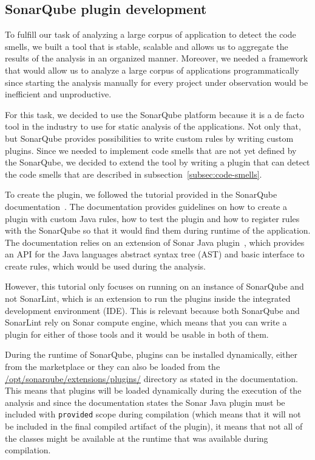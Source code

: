 \subsection{SonarQube plugin development}\label{subsec:sonarqube-plugin-development}

To fulfill our task of analyzing a large corpus of application to detect the code smells,
we built a tool that is stable, scalable and allows us to aggregate the results of the
analysis in an organized manner.
Moreover, we needed a framework that would allow us to analyze a large corpus of applications programmatically since starting
the analysis manually for every project under observation would be inefficient and unproductive.

For this task, we decided to use the SonarQube platform because it is a de facto tool in the industry to use
for static analysis of the applications.
Not only that, but SonarQube provides possibilities to write custom rules by writing custom plugins.
Since we needed to implement code smells that are not yet defined by the SonarQube, we decided to extend
the tool by writing a plugin that can detect the code smells that are described in subsection~\ref{subsec:code-smells}.

To create the plugin, we followed the tutorial provided in the SonarQube documentation~\cite{sonar_plugin_tutorial}.
The documentation provides guidelines on how to create a plugin with custom Java rules, how to test the plugin and
how to register rules with the SonarQube so that it would find them during runtime of the application.
The documentation relies on an extension of Sonar Java plugin~\cite{sonar_java_plugin}, which provides an API
for the Java languages abstract syntax tree (AST) and basic interface to create rules, which would be used
during the analysis.

However, this tutorial only focuses on running on an instance of SonarQube and not SonarLint, which is an
extension to run the plugins inside the integrated development environment (IDE).
This is relevant because both SonarQube and SonarLint rely on Sonar compute engine, which means that you can write
a plugin for either of those tools and it would be usable in both of them.

During the runtime of SonarQube, plugins can be installed dynamically, either from the marketplace or they can
also be loaded from the \url{/opt/sonarqube/extensions/plugins/} directory as stated in the documentation.
This means that plugins will be loaded dynamically during the execution of the analysis and since the documentation
states the Sonar Java plugin must be included with \verb|provided| scope during compilation (which means that it
will not be included in the final compiled artifact of the plugin), it means that not all of the classes might be
available at the runtime that was available during compilation.

